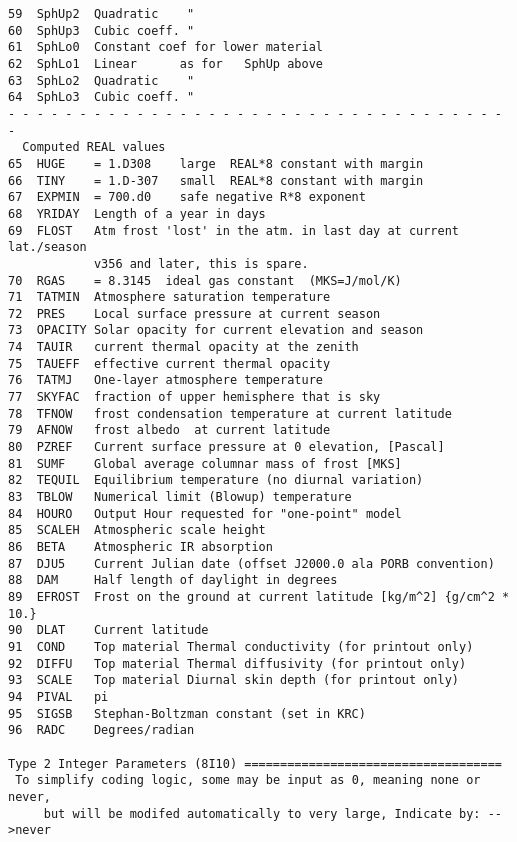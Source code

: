 \documentclass{article}
\begin{document}
\begin{verbatim}
59  SphUp2  Quadratic    " 
60  SphUp3  Cubic coeff. "
61  SphLo0  Constant coef for lower material 
62  SphLo1  Linear      as for   SphUp above
63  SphLo2  Quadratic    "
64  SphLo3  Cubic coeff. "
- - - - - - - - - - - - - - - - - - - - - - - - - - - - - - - - - - - -
  Computed REAL values
65  HUGE    = 1.D308    large  REAL*8 constant with margin
66  TINY    = 1.D-307   small  REAL*8 constant with margin
67  EXPMIN  = 700.d0    safe negative R*8 exponent
68  YRIDAY  Length of a year in days
69  FLOST   Atm frost 'lost' in the atm. in last day at current lat./season
            v356 and later, this is spare.
70  RGAS    = 8.3145  ideal gas constant  (MKS=J/mol/K)
71  TATMIN  Atmosphere saturation temperature
72  PRES    Local surface pressure at current season
73  OPACITY Solar opacity for current elevation and season
74  TAUIR   current thermal opacity at the zenith
75  TAUEFF  effective current thermal opacity 
76  TATMJ   One-layer atmosphere temperature
77  SKYFAC  fraction of upper hemisphere that is sky
78  TFNOW   frost condensation temperature at current latitude
79  AFNOW   frost albedo  at current latitude
80  PZREF   Current surface pressure at 0 elevation, [Pascal]
81  SUMF    Global average columnar mass of frost [MKS]
82  TEQUIL  Equilibrium temperature (no diurnal variation)
83  TBLOW   Numerical limit (Blowup) temperature
84  HOURO   Output Hour requested for "one-point" model
85  SCALEH  Atmospheric scale height
86  BETA    Atmospheric IR absorption
87  DJU5    Current Julian date (offset J2000.0 ala PORB convention)
88  DAM     Half length of daylight in degrees
89  EFROST  Frost on the ground at current latitude [kg/m^2] {g/cm^2 * 10.} 
90  DLAT    Current latitude
91  COND    Top material Thermal conductivity (for printout only)
92  DIFFU   Top material Thermal diffusivity (for printout only)
93  SCALE   Top material Diurnal skin depth (for printout only)
94  PIVAL   pi
95  SIGSB   Stephan-Boltzman constant (set in KRC)
96  RADC    Degrees/radian

Type 2 Integer Parameters (8I10) ====================================
 To simplify coding logic, some may be input as 0, meaning none or never,
     but will be modifed automatically to very large, Indicate by: -->never 


\end{verbatim}
\end{document}

